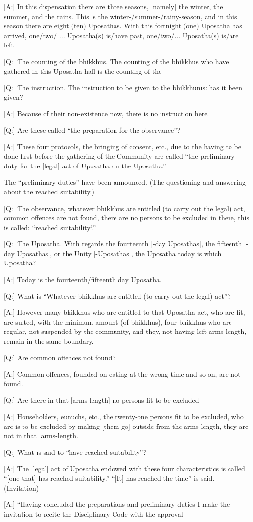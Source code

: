 [A:] In this dispensation there are three seasons, [namely] the winter,
the summer, and the rains.
This is the winter-/summer-/rainy-season, and in this season there are
eight (ten) Uposathas. With this fortnight (one) Uposatha has arrived,
one/two/ ... Uposatha(s) is/have past, one/two/... Uposatha(s) is/are
left.

	[Q:] The counting of the bhikkhus. The counting of the bhikkhus
who have gathered in this Uposatha-hall is the counting of the

	[Q:] The instruction. The instruction to be given to the bhikkhunīs:
has it been given?

[A:] Because of their non-existence now, there is no instruction here.

	[Q:] Are these called ``the preparation for the observance''?

[A:] These four protocols, the bringing of consent, etc., due to the
having to be done first before the gathering of the Community are
called ``the preliminary duty for the [legal] act of Uposatha on the
Uposatha.''

The ``preliminary duties'' have been announced.
(The questioning and answering about the reached suitability.)

[Q:] The observance, whatever bhikkhus are entitled (to carry out the
legal) act, common offences are not found, there are no persons to be
excluded in there, this is called: ``reached suitability`.''

[Q:] The Uposatha. With regards the fourteenth [-day Uposathas], the
fifteenth [-day Uposathas], or the Unity [-Uposathas], the Uposatha
today is which Uposatha?

[A:] Today is the fourteenth/fifteenth day Uposatha.

	[Q:] What is ``Whatever bhikkhus are entitled (to carry out the legal)
act''?

[A:] However many bhikkhus who are entitled to that Uposatha-act,
who are fit, are suited, with the minimum amount (of bhikkhus), four
bhikkhus who are regular, not suspended by the community, and
they, not having left arms-length, remain in the same boundary.

	[Q:] Are common offences not found?

[A:] Common offences, founded on eating at the wrong time and so
on, are not found.

	[Q:] Are there in that [arms-length] no persons fit to be excluded

	[A:] Householders, eunuchs, etc., the twenty-one persons fit to be
excluded, who are is to be excluded by making [them go] outside from
the arms-length, they are not in that [arms-length.]

	[Q:] What is said to ``have reached suitability''?

[A:] The [legal] act of Uposatha endowed with these four
characteristics is called ``[one that] has reached suitability.'' ``[It] has
reached the time'' is said.
(Invitation)

[A:] ``Having concluded the preparations and preliminary duties I
make the invitation to recite the Disciplinary Code with the approval

